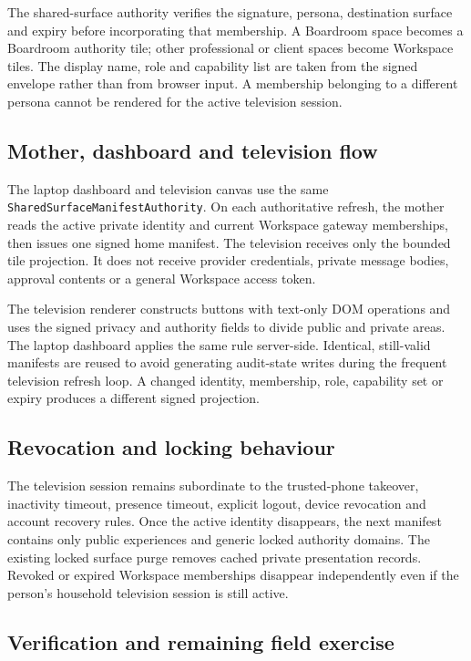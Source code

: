 The shared-surface authority verifies the signature, persona, destination surface
and expiry before incorporating that membership.  A Boardroom space becomes a
Boardroom authority tile; other professional or client spaces become Workspace
tiles.  The display name, role and capability list are taken from the signed
envelope rather than from browser input.  A membership belonging to a different
persona cannot be rendered for the active television session.

\subsection{Mother, dashboard and television flow}

The laptop dashboard and television canvas use the same
\texttt{SharedSurfaceManifestAuthority}.  On each authoritative refresh, the mother
reads the active private identity and current Workspace gateway memberships, then
issues one signed home manifest.  The television receives only the bounded tile
projection.  It does not receive provider credentials, private message bodies,
approval contents or a general Workspace access token.

The television renderer constructs buttons with text-only DOM operations and uses
the signed privacy and authority fields to divide public and private areas.  The
laptop dashboard applies the same rule server-side.  Identical, still-valid
manifests are reused to avoid generating audit-state writes during the frequent
television refresh loop.  A changed identity, membership, role, capability set or
expiry produces a different signed projection.

\subsection{Revocation and locking behaviour}

The television session remains subordinate to the trusted-phone takeover,
inactivity timeout, presence timeout, explicit logout, device revocation and account
recovery rules.  Once the active identity disappears, the next manifest contains
only public experiences and generic locked authority domains.  The existing locked
surface purge removes cached private presentation records.  Revoked or expired
Workspace memberships disappear independently even if the person's household
television session is still active.

\subsection{Verification and remaining field exercise}

